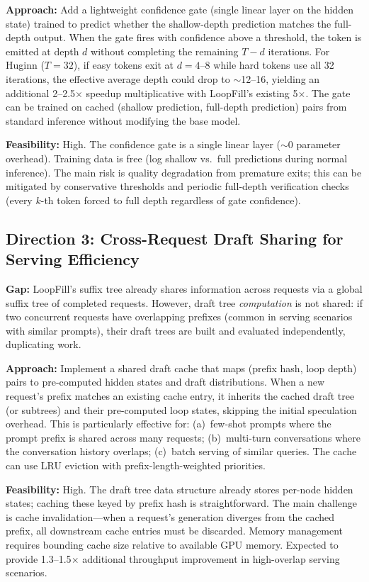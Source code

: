\documentclass[11pt,a4paper]{article}
\begin{document}
\textbf{Approach:} Add a lightweight confidence gate (single linear layer on the hidden state) trained to predict whether the shallow-depth prediction matches the full-depth output. When the gate fires with confidence above a threshold, the token is emitted at depth $d$ without completing the remaining $T - d$ iterations. For Huginn ($T{=}32$), if easy tokens exit at $d{=}4$--$8$ while hard tokens use all 32 iterations, the effective average depth could drop to $\sim$12--16, yielding an additional 2--2.5$\times$ speedup multiplicative with LoopFill's existing 5$\times$. The gate can be trained on cached (shallow prediction, full-depth prediction) pairs from standard inference without modifying the base model.

\textbf{Feasibility:} High. The confidence gate is a single linear layer ($\sim$0 parameter overhead). Training data is free (log shallow vs.\ full predictions during normal inference). The main risk is quality degradation from premature exits; this can be mitigated by conservative thresholds and periodic full-depth verification checks (every $k$-th token forced to full depth regardless of gate confidence).

\subsection{Direction 3: Cross-Request Draft Sharing for Serving Efficiency}
\textbf{Gap:} LoopFill's suffix tree already shares information across requests via a global suffix tree of completed requests. However, draft tree \emph{computation} is not shared: if two concurrent requests have overlapping prefixes (common in serving scenarios with similar prompts), their draft trees are built and evaluated independently, duplicating work.

\textbf{Approach:} Implement a shared draft cache that maps (prefix hash, loop depth) pairs to pre-computed hidden states and draft distributions. When a new request's prefix matches an existing cache entry, it inherits the cached draft tree (or subtrees) and their pre-computed loop states, skipping the initial speculation overhead. This is particularly effective for: (a)~few-shot prompts where the prompt prefix is shared across many requests; (b)~multi-turn conversations where the conversation history overlaps; (c)~batch serving of similar queries. The cache can use LRU eviction with prefix-length-weighted priorities.

\textbf{Feasibility:} High. The draft tree data structure already stores per-node hidden states; caching these keyed by prefix hash is straightforward. The main challenge is cache invalidation---when a request's generation diverges from the cached prefix, all downstream cache entries must be discarded. Memory management requires bounding cache size relative to available GPU memory. Expected to provide 1.3--1.5$\times$ additional throughput improvement in high-overlap serving scenarios.
\end{document}
